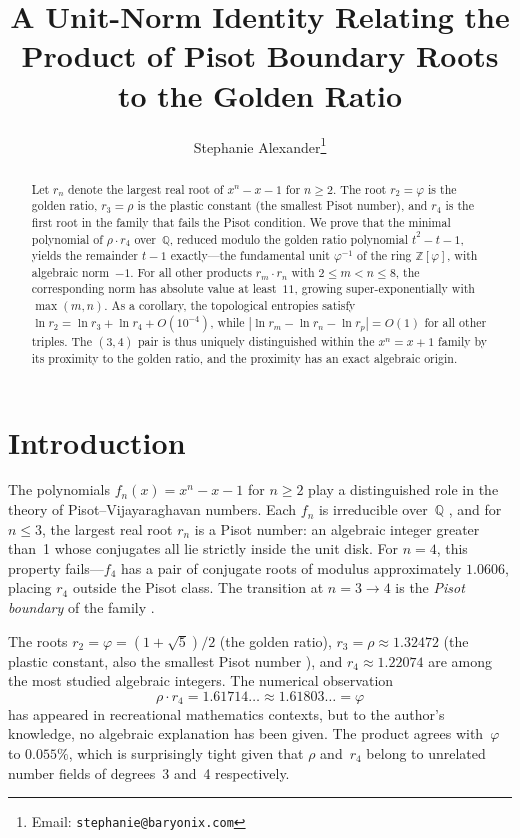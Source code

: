 \documentclass[12pt]{article}
\title{A Unit-Norm Identity Relating the Product of Pisot Boundary Roots to the Golden Ratio}
\author{Stephanie Alexander\thanks{Email: \texttt{stephanie@baryonix.com}}}
\date{}
\newcommand{\Z}{\mathbb{Z}}
\newcommand{\Q}{\mathbb{Q}}
\begin{document}
\maketitle

\begin{abstract}
Let $r_n$ denote the largest real root of $x^n - x - 1$ for $n \geq 2$.
The root $r_2 = \varphi$ is the golden ratio, $r_3 = \rho$ is the plastic
constant (the smallest Pisot number), and $r_4$ is the first root in
the family that fails the Pisot condition. We prove that the minimal
polynomial of $\rho \cdot r_4$ over~$\Q$, reduced modulo the golden
ratio polynomial $t^2 - t - 1$, yields the remainder $t - 1$
exactly---the fundamental unit $\varphi^{-1}$ of the ring $\Z[\varphi]$,
with algebraic norm~$-1$. For all other products $r_m \cdot r_n$ with
$2 \leq m < n \leq 8$, the corresponding norm has absolute value at
least~$11$, growing super-exponentially with $\max(m,n)$. As a corollary,
the topological entropies satisfy $\ln r_2 = \ln r_3 + \ln r_4 +
O(10^{-4})$, while $|\ln r_m - \ln r_n - \ln r_p| = O(1)$ for all other
triples. The $(3,4)$ pair is thus uniquely distinguished within the
$x^n = x + 1$ family by its proximity to the golden ratio, and the
proximity has an exact algebraic origin.
\end{abstract}


\section{Introduction}

The polynomials $f_n(x) = x^n - x - 1$ for $n \geq 2$ play a
distinguished role in the theory of Pisot--Vijayaraghavan numbers.
Each $f_n$ is irreducible over~$\Q$ \cite{selmer}, and for $n \leq 3$,
the largest real root $r_n$ is a Pisot number: an algebraic integer
greater than~1 whose conjugates all lie strictly inside the unit disk.
For $n = 4$, this property fails---$f_4$ has a pair of conjugate roots
of modulus approximately $1.0606$, placing $r_4$ outside the Pisot
class. The transition at $n = 3 \to 4$ is the \emph{Pisot boundary}
of the family \cite{bertin}.

The roots $r_2 = \varphi = (1+\sqrt{5})/2$ (the golden ratio),
$r_3 = \rho \approx 1.32472$ (the plastic constant, also the smallest
Pisot number \cite{siegel}), and $r_4 \approx 1.22074$ are among the
most studied algebraic integers. The numerical observation
\begin{equation}\label{eq:approx}
  \rho \cdot r_4 = 1.61714\ldots \approx 1.61803\ldots = \varphi
\end{equation}
has appeared in recreational mathematics contexts, but to the author's
knowledge, no algebraic explanation has been given. The product agrees
with~$\varphi$ to $0.055\%$, which is surprisingly tight given that
$\rho$ and~$r_4$ belong to unrelated number fields of degrees~3
and~4 respectively.
\end{document}
